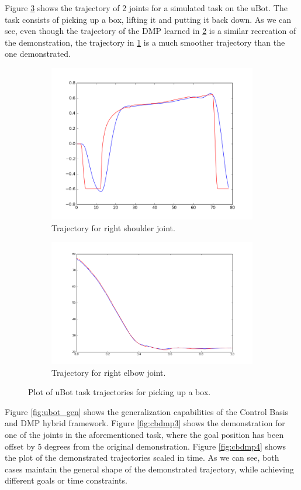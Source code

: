 \documentclass[a4paper]{article}
\begin{document}
\indent Figure \ref{fig:ubot} shows the trajectory of 2 joints for a simulated task on the uBot. The task consists of picking up a box, lifting it and putting it back down. As we can see, even though the trajectory of the DMP learned in \ref{fig:cbdmp2} is a similar recreation of the demonstration, the trajectory in \ref{fig:cbdmp1} is a much smoother trajectory than the one demonstrated. 


\begin{figure}
\centering
\begin{subfigure}{.5\textwidth}
  \centering
  \includegraphics[width=.8\linewidth]{cb_dmp1.png}
  \caption{Trajectory for right shoulder joint.}
  \label{fig:cbdmp1}
\end{subfigure}%
\begin{subfigure}{.5\textwidth}
  \centering
  \includegraphics[width=.8\linewidth]{cb_dmp2.png}
  \caption{Trajectory for right elbow joint.}
  \label{fig:cbdmp2}
\end{subfigure}
\caption{Plot of uBot task trajectories for picking up a box.}
\label{fig:ubot}
\end{figure}
 
 
Figure \ref{fig:ubot_gen} shows the generalization capabilities of the Control Basis and DMP hybrid framework. Figure \ref{fig:cbdmp3} shows the demonstration for one of the joints in the aforementioned task, where the goal position has been offset by 5 degrees from the original demonstration. Figure \ref{fig:cbdmp4} shows the plot of the demonstrated trajectories scaled in time. As we can see, both cases maintain the general shape of the demonstrated trajectory, while achieving different goals or time constraints.
 
\end{document}
